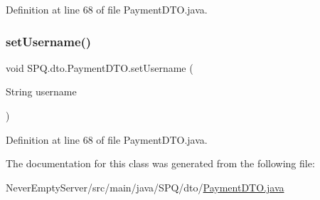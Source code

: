 Definition at line 68 of file Payment\+D\+T\+O.\+java.

\mbox{\label{class_s_p_q_1_1dto_1_1_payment_d_t_o_aaad1620f8f86cb26566476c22bfcd3af}} 
\subsubsection{\texorpdfstring{set\+Username()}{setUsername()}\hspace{0.1cm}{\footnotesize\ttfamily [3/3]}}
{\footnotesize\ttfamily void S\+P\+Q.\+dto.\+Payment\+D\+T\+O.\+set\+Username (\begin{DoxyParamCaption}\item[{String}]{username }\end{DoxyParamCaption})}



Definition at line 68 of file Payment\+D\+T\+O.\+java.



The documentation for this class was generated from the following file\+:\begin{DoxyCompactItemize}
\item 
Never\+Empty\+Server/src/main/java/\+S\+P\+Q/dto/\mbox{\hyperlink{_never_empty_server_2src_2main_2java_2_s_p_q_2dto_2_payment_d_t_o_8java}{Payment\+D\+T\+O.\+java}}\end{DoxyCompactItemize}
